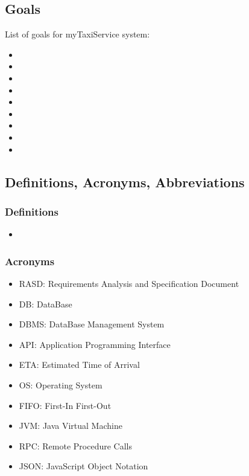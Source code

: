 \documentclass[a4paper,12pt]{article}%
\newcounter{goals_counter}
\begin{document}
\subsection{Goals}
List of goals for myTaxiService system:
\begin{itemize}
\item {}
\item {}
\item {}
\item {}
\item {}
\item {}
\item {}
\item {} 
\item {} 
\end{itemize}
\subsection{Definitions, Acronyms, Abbreviations}
\subsubsection{Definitions}
\begin{itemize}
\item 
\end{itemize}
\subsubsection{Acronyms}
\begin{itemize}
\item RASD: Requirements Analysis and Specification Document
\item DB: DataBase
\item DBMS: DataBase Management System
\item API: Application Programming Interface
\item ETA: Estimated Time of Arrival
\item OS: Operating System
\item FIFO: First-In First-Out
\item JVM: Java Virtual Machine
\item RPC: Remote Procedure Calls
\item JSON: JavaScript Object Notation
\end{itemize}
\end{document}

